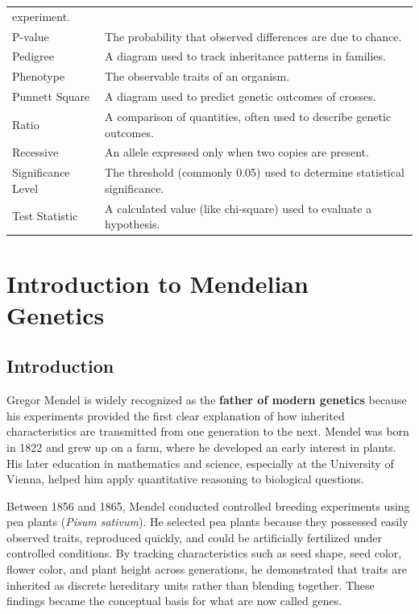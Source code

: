 \documentclass[
  letterpaper,
  DIV=11,
  numbers=noendperiod]{scrreprt}
\begin{document}
{\begin{longtable}[]{@{}
  >{\raggedright\arraybackslash}p{}
  >{\raggedright\arraybackslash}p{}@{}}
experiment. \\
P-value & The probability that observed differences are due to
chance. \\
Pedigree & A diagram used to track inheritance patterns in families. \\
Phenotype & The observable traits of an organism. \\
Punnett Square & A diagram used to predict genetic outcomes of
crosses. \\
Ratio & A comparison of quantities, often used to describe genetic
outcomes. \\
Recessive & An allele expressed only when two copies are present. \\
Significance Level & The threshold (commonly 0.05) used to determine
statistical significance. \\
Test Statistic & A calculated value (like chi-square) used to evaluate a
hypothesis. \\
\end{longtable}
}


\chapter{\texorpdfstring{\textbf{Introduction to Mendelian
Genetics}}{Introduction to Mendelian Genetics}}\label{introduction-to-mendelian-genetics}

\section{\texorpdfstring{\textbf{Introduction}}{Introduction}}\label{introduction-4}

Gregor Mendel is widely recognized as the \textbf{father of modern
genetics} because his experiments provided the first clear explanation
of how inherited characteristics are transmitted from one generation to
the next. Mendel was born in 1822 and grew up on a farm, where he
developed an early interest in plants. His later education in
mathematics and science, especially at the University of Vienna, helped
him apply quantitative reasoning to biological questions.

Between 1856 and 1865, Mendel conducted controlled breeding experiments
using pea plants (\emph{Pisum sativum}). He selected pea plants because
they possessed easily observed traits, reproduced quickly, and could be
artificially fertilized under controlled conditions. By tracking
characteristics such as seed shape, seed color, flower color, and plant
height across generations, he demonstrated that traits are inherited as
discrete hereditary units rather than blending together. These findings
became the conceptual basis for what are now called genes.
\end{document}
